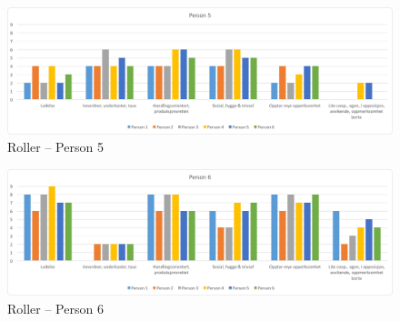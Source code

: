\begin{figure}[!ht]
\centering
\includegraphics[width=1\textwidth]{gfx/roller_person5.png}
\caption{Roller – Person 5}
\label{roller_person5}
\end{figure}

\begin{figure}[!ht]
\centering
\includegraphics[width=1\textwidth]{gfx/roller_person6.png}
\caption{Roller – Person 6}
\label{roller_person6}
\end{figure}